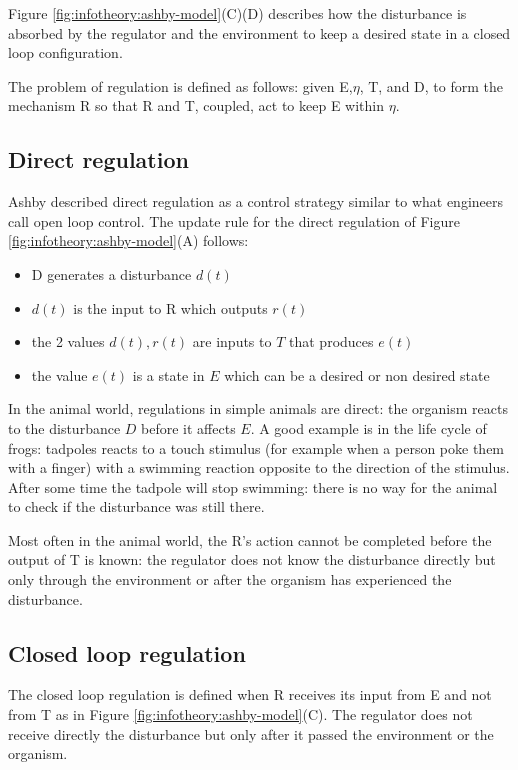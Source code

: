 Figure \ref{fig:infotheory:ashby-model}(C)(D) describes how the disturbance is absorbed by the regulator
 and the environment to keep a desired state in a closed loop configuration.

The problem of regulation is defined as follows: 
given E,$\eta$, T, and D, to form the mechanism R so that R and T, coupled, 
act to keep E within $\eta$.

\subsection{Direct regulation}
Ashby described direct regulation as a control strategy similar to what engineers
call open loop control.
The update rule for the direct regulation of Figure \ref{fig:infotheory:ashby-model}(A) follows:
\begin{itemize}
 \item D generates a disturbance $d(t)$
 \item $d(t)$ is the input to R which outputs $r(t)$
 \item the 2 values $d(t),r(t)$ are inputs to $T$ that produces $e(t)$
 \item the value $e(t)$ is a state in $E$ which can be a desired or non desired state
\end{itemize}
In the animal world, regulations in simple animals are direct: the organism reacts to the disturbance $D$ before it affects $E$.
A good example is in the life cycle of frogs: tadpoles reacts to a touch stimulus (for example
when a person poke them with a finger) with a swimming reaction opposite to the
direction of the stimulus.
After some time the tadpole will stop swimming: there is no way for the animal
to check if the disturbance was still there.

Most often in the animal world, the R's action cannot be completed before the output of T
is known: the regulator does not know the disturbance directly but only through
the environment or after the organism has experienced the disturbance.


\subsection{Closed loop regulation}
The closed loop regulation is defined when R receives its input from E and not from T
as in Figure \ref{fig:infotheory:ashby-model}(C).
The regulator does not receive directly the disturbance but only after it passed
the environment or the organism.

